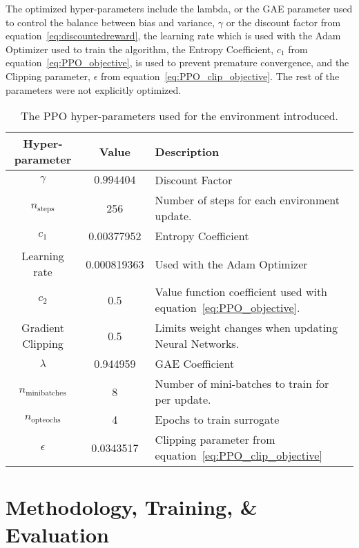 The optimized hyper-parameters include the lambda, or the GAE parameter used to control the balance between bias and variance, $\gamma$ or the discount factor from equation~\ref{eq:discountedreward}, the learning rate which is used with the Adam Optimizer used to train the algorithm, the Entropy Coefficient, $c_1$ from equation~\ref{eq:PPO_objective}, is used to prevent premature convergence, and the Clipping parameter, $\epsilon$ from equation~\ref{eq:PPO_clip_objective}. The rest of the parameters were not explicitly optimized. 

\begin{table}
	\begin{tabularx}{\columnwidth}{|c|c|X|} \hline
		Hyper-parameter & Value & Description \\\hline\hline
		$\gamma$ & $0.994404$ & Discount Factor\\\hline
		$n_{\text{steps}}$ & 256 & Number of steps for each environment update. \\\hline
		$c_1$ & 0.00377952 & Entropy Coefficient \\\hline
		Learning rate & 0.000819363 & Used with the Adam Optimizer \\\hline
		$c_2$ & 0.5 & Value function coefficient used with equation~\ref{eq:PPO_objective}. \\\hline
		Gradient Clipping & 0.5 & Limits weight changes when updating Neural Networks. \\\hline
		$\lambda$ & 0.944959 & GAE Coefficient \\\hline
		$n_{\text{minibatches}}$ & 8 & Number of mini-batches to train for per update. \\\hline
		$n_{\text{opteochs}}$ & 4 & Epochs to train surrogate \\\hline
		$\epsilon$ & 0.0343517 & Clipping parameter from equation~\ref{eq:PPO_clip_objective} \\\hline
	\end{tabularx}
	\caption{The PPO hyper-parameters used for the environment introduced.}\label{table:ppo_parameters}
\end{table}

\section{Methodology, Training, \& Evaluation}

